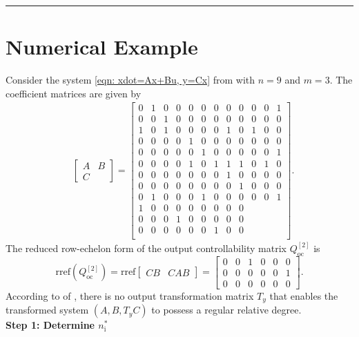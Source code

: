 \documentclass[sort&compress]{elsarticle}
\newcommand\nsharp{n_\mathrm i^*}
\newcommand\Qoc{Q_\mathrm{oc}}
\newcommand\rref{\mathrm{rref}}
\begin{document}
\vspace{-0.5em}\noindent\rule{\linewidth}{1pt}\vspace{-1em}

\section{Numerical Example}

Consider the system \eqref{eqn: xdot=Ax+Bu, y=Cx} from \cite{Fomichev2017DE[J]} with $n=9$ and $m=3$.
The coefficient matrices are given by
\begin{align*}
&\left[\begin{array}{c|c}
	A&B\\ \hline
	C&
\end{array}\right]
=\left[\begin{array}{ccccccccc|ccc}
0&1&0&0&0&0&0&0&0 & 0&0&1\\
0&0&1&0&0&0&0&0&0 & 0&0&0\\
1&0&1&0&0&0&0&1&0 & 1&0&0\\
0&0&0&0&1&0&0&0&0 & 0&0&0\\
0&0&0&0&0&1&0&0&0 & 0&0&1\\
0&0&0&0&1&0&1&1&1 & 0&1&0\\
0&0&0&0&0&0&0&1&0 & 0&0&0\\
0&0&0&0&0&0&0&0&1 & 0&0&0\\
0&1&0&0&0&1&0&0&0 & 0&0&1\\
\hline
1&0&0&0&0&0&0&0&0 & &&\\
0&0&0&1&0&0&0&0&0 & &&\\
0&0&0&0&0&0&1&0&0 & &&\\
\end{array}\right].
\end{align*}
The reduced row-echelon form of the output controllability matrix $\Qoc^{[2]}$ is
\[
\rref(\Qoc^{[2]})
=\rref\begin{bmatrix}CB&CAB\end{bmatrix}
=\left[\begin{array}{ccc|ccc}
0&0&1 & 0&0&0\\
0&0&0 & 0&0&1\\
0&0&0 & 0&0&0
\end{array}\right].
\]
According to  of ,
there is no output transformation matrix $T_y$ that enables
the transformed system $(A,B,T_yC)$ to possess a regular relative degree.
\\
\textbf{Step 1: Determine $\nsharp$}
\\
\end{document}
